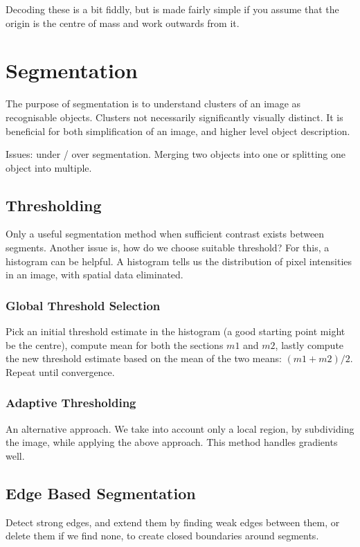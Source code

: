 \documentclass{article}
\begin{document}
    Decoding these is a bit fiddly, but is made fairly simple if you assume that the origin is the centre of mass and work outwards from it.

\section{Segmentation}

    The purpose of segmentation is to understand clusters of an image as recognisable objects. Clusters not necessarily significantly visually distinct. It is beneficial for both simplification of an image, and higher level object description.
    
    Issues: under / over segmentation. Merging two objects into one or splitting one object into multiple.
        
    \subsection{Thresholding}
        Only a useful segmentation method when sufficient contrast exists between segments. Another issue is, how do we choose suitable threshold? For this, a histogram can be helpful. A histogram tells us the distribution of pixel intensities in an image, with spatial data eliminated.
        \subsubsection{Global Threshold Selection}
            Pick an initial threshold estimate in the histogram (a good starting point might be the centre), compute mean for both the sections $m1$ and $m2$, lastly compute the new threshold estimate based on the mean of the two means: $(m1 + m2)/2$. Repeat until convergence.
        \subsubsection{Adaptive Thresholding}
            An alternative approach. We take into account only a local region, by subdividing the image, while applying the above approach. This method handles gradients well.

    \subsection {Edge Based Segmentation}
        Detect strong edges, and extend them by finding weak edges between them, or delete them if we find none, to create closed boundaries around segments.
\end{document}
